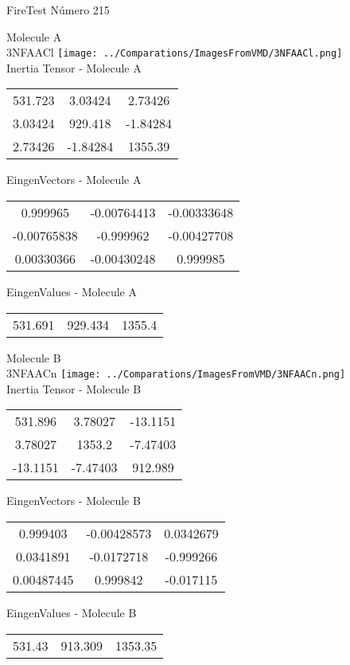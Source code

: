 \vtab[-2cm]
\begin{center}
{\large FireTest \tab Número 215}
\end{center}
\begin{multicols}{2}
\begin{center}

Molecule A \\ 
3NFAACl
\texttt{[image: ../Comparations/ImagesFromVMD/3NFAACl.png]}
\\
Inertia Tensor - Molecule A \\
\vtab

\begin{tabular}{|c c c|}
531.723	 & 	3.03424	 & 	2.73426	 \\
3.03424	 & 	929.418	 & 	-1.84284	 \\
2.73426	 & 	-1.84284	 & 	1355.39
\end{tabular}

\vtab
 EingenVectors - Molecule A     \\
\vtab
\begin{tabular}{|c c c|}
0.999965	 & 	-0.00764413	 & 	-0.00333648	 \\
-0.00765838	 & 	-0.999962	 & 	-0.00427708	 \\
0.00330366	 & 	-0.00430248	 & 	0.999985
\end{tabular}

\vtab
 EingenValues - Molecule A     \\
\vtab
\begin{tabular}{|c c c|}
531.691	 & 	929.434	 & 	1355.4	 \\
\end{tabular}
\columnbreak

Molecule B \\ 
3NFAACn
\texttt{[image: ../Comparations/ImagesFromVMD/3NFAACn.png]}
\\
Inertia Tensor - Molecule B \\
\vtab

\begin{tabular}{|c c c|}
531.896	 & 	3.78027	 & 	-13.1151	 \\
3.78027	 & 	1353.2	 & 	-7.47403	 \\
-13.1151	 & 	-7.47403	 & 	912.989
\end{tabular}

\vtab
 EingenVectors - Molecule B     \\
\vtab
\begin{tabular}{|c c c|}
0.999403	 & 	-0.00428573	 & 	0.0342679	 \\
0.0341891	 & 	-0.0172718	 & 	-0.999266	 \\
0.00487445	 & 	0.999842	 & 	-0.017115
\end{tabular}

\vtab
 EingenValues - Molecule B     \\
\vtab
\begin{tabular}{|c c c|}
531.43	 & 	913.309	 & 	1353.35	 \\
\end{tabular}

\end{center}
\end{multicols}
